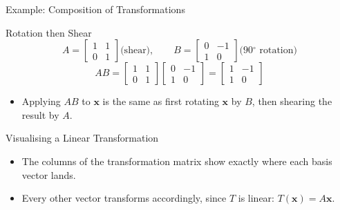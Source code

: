 \documentclass[9pt,aspectratio=169]{beamer}
\newcommand{\vect}[1]{\mathbf{#1}}
\begin{document}
\begin{frame}{Example: Composition of Transformations}
\begin{exampleblock}{Rotation then Shear}
$$A = \begin{bmatrix}1 & 1\\ 0 & 1\end{bmatrix} \text{(shear)}, \qquad B = \begin{bmatrix}0 & -1\\ 1 & 0\end{bmatrix}\text{(90$^\circ$ rotation)}$$
$$AB = \begin{bmatrix}1 & 1\\ 0 & 1\end{bmatrix}\begin{bmatrix}0 & -1\\ 1 & 0\end{bmatrix} = \begin{bmatrix}1 & -1\\ 1 & 0\end{bmatrix}$$
\end{exampleblock}
\begin{itemize}
\item Applying $AB$ to $\vect{x}$ is the same as first rotating $\vect{x}$ by $B$, then shearing the result by $A$.
\end{itemize}
\end{frame}

\begin{frame}{Visualising a Linear Transformation}
\centering
{}
\begin{itemize}
\item The columns of the transformation matrix show exactly where each basis vector lands.
\item Every other vector transforms accordingly, since $T$ is linear: $T(\vect{x}) = A\vect{x}$.
\end{itemize}
\end{frame}
\end{document}
